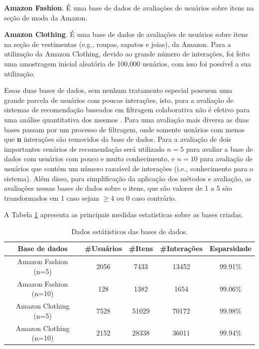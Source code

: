 \documentclass[sigconf]{acmart}
\begin{document}
\textbf{Amazon Fashion}. É uma base de dados de avaliações de usuários sobre itens na seção de moda da Amazon.

\textbf{Amazon Clothing}. É uma base de dados de avaliações de usuários sobre itens na seção de vestimentas (e.g., roupas, sapatos e joias),  da Amazon. Para a utilização da Amazon Clothing, devido ao grande número de interações, foi feito uma amostragem inicial aleatória de 100,000 usuários, com isso foi possível a sua utilização.

Essas duas bases de dados, sem nenhum tratamento especial possuem uma grande parcela de usuários com poucas interações, isto, para a avaliação de sistemas de recomendação baseados em filtragem colaborativa não é efetivo para uma análise quantitativa dos mesmos \cite{he2017neural}. Para uma avaliação mais diversa as duas bases passam por um processo de filtragem, onde somente usuários com menos que \textbf{n} interações são removidos da base de dados. Para a avaliação de dois importantes cenários de recomendação será utilizado $n=5$ para avaliar a base de dados com usuários com pouco e muito conhecimento, e $n=10$ para avaliação de usuários que contém um número razoável de interações (i.e., conhecimento para o sistema). Além disso, para simplificação da aplicação dos métodos e avaliação, as avaliações nessas bases de dados sobre o itens, que são valores de 1 a 5 são transformados em 1 caso sejam $\geq 4$ ou 0 caso contrário.

A Tabela \ref{tbl:dadosbases} apresenta as principais medidas estatisticas sobre as bases criadas.

\begin{table}[ht]
  \begin{tabular}{ccccc}
    Base de dados          & \#Usuários & \#Itens & \#Interações & Esparsidade\\\hline
    Amazon Fashion (n=5)   & 2056       & 7433    & 13452        & 99.91\%\\\hline
    Amazon Fashion (n=10)  & 128        & 1382    & 1654         & 99.06\%\\\hline
    Amazon Clothing (n=5)  & 7528       & 51029   & 70172        & 99.98\%\\\hline
    Amazon Clothing (n=10) & 2152       & 28338   & 36011        & 99.94\%\\\hline
\end{tabular}
\caption{Dados estátisticos das bases de dados.}
\label{tbl:dadosbases}
\end{table}
\end{document}
